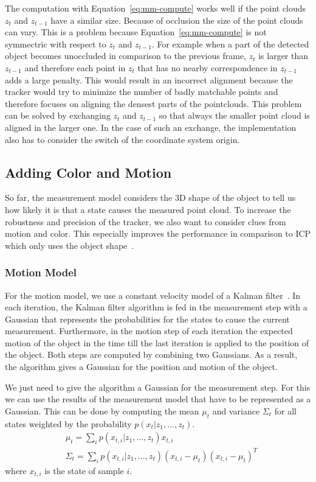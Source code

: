 \documentclass[twoside,a4paper,article]{combine}
\begin{document}
The computation with Equation~\ref{eq:mm-compute} works well if the
point clouds $z_t$ and $z_{t-1}$ have a similar size. Because of
occlusion the size of the point clouds can vary. This is a problem
because Equation~\ref{eq:mm-compute} is not symmectric with respect to
$z_t$ and $z_{t-1}$. For example when a part of the detected object
becomes unoccluded in comparison to the previous frame, $z_t$ is
larger than $z_{t-1}$ and therefore each point in $z_t$ that has no
nearby correspondence in $z_{t-1}$ adds a large penalty. This would
result in an incorrect alignment because the tracker would try to
minimize the number of badly matchable points and therefore focuses on
aligning the densest parts of the pointclouds. This problem can be
solved by exchanging $z_t$ and $z_{t-1}$ so that always the smaller
point cloud is aligned in the larger one. In the case of such an
exchange, the implementation also has to consider the switch of the
coordinate system origin.

\subsection{Adding Color and Motion}
\label{sub:adding-color}
So far, the measurement model considers the 3D shape of the object to
tell us how likely it is that a state causes the measured point
cloud. To increase the robustness and precision of the tracker, we
also want to consider clues from motion and color. This especially
improves the performance in comparison to ICP which only uses the
object shape~\cite{paper}.

\subsubsection{Motion Model}
For the motion model, we use a constant velocity model of a Kalman
filter~\cite{prob-rob}. In each iteration, the Kalman filter algorithm
is fed in the measurement step with a Gaussian that represents the
probabilities for the states to cause the current
measurement. Furthermore, in the motion step of each iteration the
expected motion of the object in the time till the last iteration is
applied to the position of the object. Both steps are computed by
combining two Gaussians. As a result, the algorithm gives a Gaussian
for the position and motion of the object.

We just need to give the algorithm a Gaussian for the measurement
step. For this we can use the results of the measurement model that
have to be represented as a Gaussian. This can be done by computing
the mean $\mu_t$ and variance $\Sigma_t$ for all states weighted by
the probability $p(x_t|z_1,...,z_t)$.
\begin{align}
\label{eq:motion-model}
& \mu_t=\sum_i p(x_{t,i}|z_1,...,z_t)x_{t,i}\nonumber\\
& \Sigma_t=\sum_i p(x_{t,i}|z_1,...,z_t) (x_{t,i}-\mu_t)(x_{t,i}-\mu_t)^T\nonumber
\end{align}
where $x_{t,i}$ is the state of sample $i$.
\end{document}
